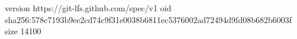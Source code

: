 version https://git-lfs.github.com/spec/v1
oid sha256:578c7193b9ee2cd74c9f31e0038b6811ec5376002ad72494d9fd08b682b6003f
size 14100
